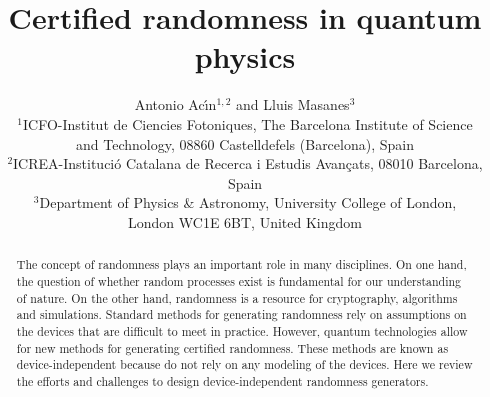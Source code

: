 \documentclass[11pt,a4paper]{article}
\begin{document}
\title{Certified randomness in quantum physics}
\author{Antonio Ac\'{\i}n$^{1,2}$ and Lluis Masanes$^{3}$\\[0.5em]
$^{1}$ICFO-Institut de Ciencies Fotoniques, The Barcelona Institute of Science\\ and Technology,
08860 Castelldefels (Barcelona), Spain\\
$^{2}$ICREA-Instituci\'o Catalana de Recerca i Estudis Avan\c
cats, 08010 Barcelona, Spain\\
$^3$Department of Physics \& Astronomy, University College of London,\\
London WC1E 6BT, United Kingdom}

\date{}

\maketitle

\begin{abstract}
%

The concept of randomness plays an important role in many
disciplines. On one hand, the question of whether random processes
exist is fundamental for our understanding of nature. On the other
hand, randomness is a resource for cryptography, algorithms and
simulations.  Standard methods for generating randomness rely on
assumptions on the devices that are difficult to meet in practice.
However, quantum technologies allow for new methods for generating
certified randomness. These methods are known as
device-independent because do not rely on any modeling of the
devices. Here we review the efforts and challenges to design
device-independent randomness generators.
\end{abstract}
\end{document}
